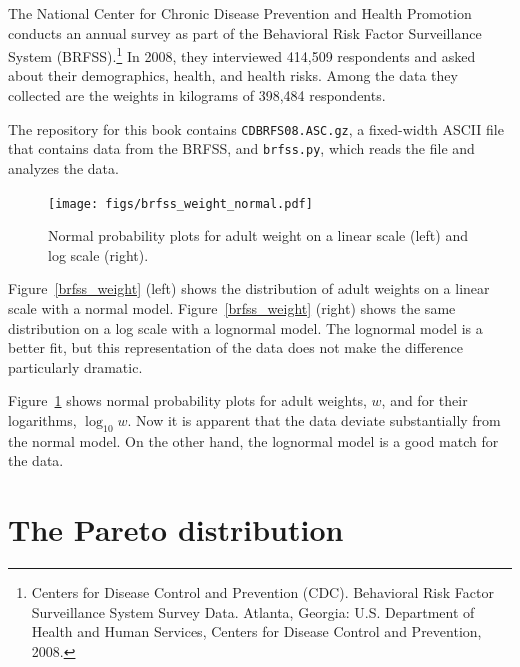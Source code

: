 \documentclass[12pt]{book}
\theoremstyle{exercise}
\begin{document}
The National Center for Chronic Disease
Prevention and Health Promotion conducts an annual survey as part of
the Behavioral Risk Factor Surveillance System
(BRFSS).\footnote{Centers for Disease Control and Prevention
  (CDC). Behavioral Risk Factor Surveillance System Survey
  Data. Atlanta, Georgia: U.S. Department of Health and Human
  Services, Centers for Disease Control and Prevention, 2008.}  In
2008, they interviewed 414,509 respondents and asked about their
demographics, health, and health risks.
Among the data they collected are the weights in kilograms of
398,484 respondents.%
%

The repository for this book contains {\tt CDBRFS08.ASC.gz},
a fixed-width ASCII file that contains data from the BRFSS,
and {\tt brfss.py}, which reads the file and analyzes the data.

\begin{figure}
\centerline{
\texttt{[image: figs/brfss\_weight\_normal.pdf]}}
\caption{Normal probability plots for adult weight on a linear scale
  (left) and log scale (right).}%
\label{brfss_weight_normal}
\end{figure}

Figure~\ref{brfss_weight} (left) shows the distribution of adult
weights on a linear scale with a normal model.
Figure~\ref{brfss_weight} (right) shows the same distribution on a log
scale with a lognormal model.  The lognormal model is a better fit,
but this representation of the data does not make the difference
particularly dramatic.%
%

Figure~\ref{brfss_weight_normal} shows normal probability plots for
adult weights, $w$, and for their logarithms, $\log_{10} w$.  Now it
is apparent that the data deviate substantially from the normal model.
On the other hand, the lognormal model is a good match for the data.%
%
%
%
%
%
%
%
%
%
%


\section{The Pareto distribution}%
%
%
\end{document}
